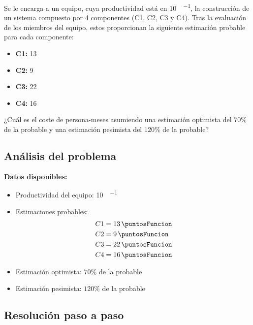 

\begin{enunciado}
    Se le encarga a un equipo, cuya productividad está en \qty{10}{\puntosFuncion\per\porMes}, la construcción de un sistema compuesto por 4 componentes (C1, C2, C3 y C4).
    Tras la evaluación de los miembros del equipo, estos proporcionan la siguiente estimación probable para cada componente:

    \begin{itemize}[leftmargin=*]
        \item \textbf{C1:} \qty{13}{\puntosFuncion}
        \item \textbf{C2:} \qty{9}{\puntosFuncion}
        \item \textbf{C3:} \qty{22}{\puntosFuncion}
        \item \textbf{C4:} \qty{16}{\puntosFuncion}
    \end{itemize}

    ¿Cuál es el coste de persona-meses asumiendo una estimación optimista del $70\%$ de la probable y una estimación pesimista del $120\%$ de la probable?
\end{enunciado}

\subsection{Análisis del problema}\label{subsec:analisis-del-problema}

\textbf{Datos disponibles:}
\begin{itemize}[leftmargin=*]
    \item Productividad del equipo: \qty{10}{\puntosFuncion\per\porMes}
    \item Estimaciones probables:
    \begin{align*}
        C1 &= \qty{13}{\puntosFuncion}\\
        C2 &= \qty{9}{\puntosFuncion}\\
        C3 &= \qty{22}{\puntosFuncion}\\
        C4 &= \qty{16}{\puntosFuncion}
    \end{align*}
    \item Estimación optimista: $70\%$ de la probable
    \item Estimación pesimista: $120\%$ de la probable
\end{itemize}

\subsection{Resolución paso a paso}\label{subsec:resolucion-paso-a-paso-1P}

